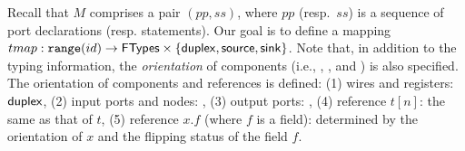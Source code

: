 
Recall that $M$ comprises a pair $(pp, ss)$, where $pp$ (resp.\ $ss$) is a sequence of port declarations (resp. statements).
Our goal is to %
define a mapping $tmap: \mathtt{range}(id)\rightarrow{\sf FTypes} \times \{{\sf duplex}, {\sf source}, {\sf sink}\}$.
%
Note that, in addition to the typing information, the \emph{orientation} of components (i.e., \duplex, \source, and \sink) is also specified.   %
The orientation of components and references is defined:
(1) wires and registers: ${\sf duplex}$, (2)
input ports and nodes: \source, (3) output ports: \sink,
(4) reference $t[n]$: the same as that of $t$, (5) reference $x.f$ (where $f$ is a field): determined by the orientation of $x$ and the flipping status of the field $f$.


